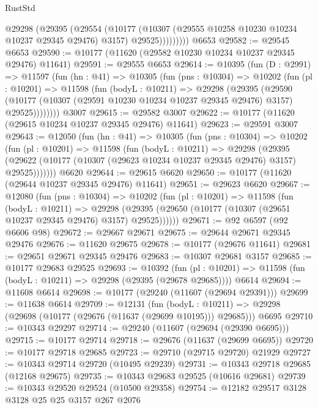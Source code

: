 \begin{lexlean}{RustStd}
\begin{coremodule}
              @29298
                (@29395
                  (@29554
                    (@10177
                      (@10307 (@29555 @10258 @10230 @10234 @10237 @29345 @29476) @3157)
                      @29525)))))))))
    @6653
@29582 := @29545 @6653
@29590 := @10177 (@11620 (@29582 @10230 @10234 @10237 @29345 @29476) @11641)
@29591 := @29555 @6653
@29614 := @10395
    (fun (D : @2991) =>
    @11597
      (fun (hn : @41) =>
      @10305
        (fun (pns : @10304) =>
        @10202
          (fun (pl : @10201) =>
          @11598
            (fun (bodyL : @10211) =>
            @29298
              (@29395
                (@29590
                  (@10177 (@10307 (@29591 @10230 @10234 @10237 @29345 @29476) @3157) @29525))))))))
    @3007
@29615 := @29582 @3007
@29622 := @10177 (@11620 (@29615 @10234 @10237 @29345 @29476) @11641)
@29623 := @29591 @3007
@29643 := @12050
    (fun (hn : @41) =>
    @10305
      (fun (pns : @10304) =>
      @10202
        (fun (pl : @10201) =>
        @11598
          (fun (bodyL : @10211) =>
          @29298
            (@29395
              (@29622 (@10177 (@10307 (@29623 @10234 @10237 @29345 @29476) @3157) @29525)))))))
    @6620
@29644 := @29615 @6620
@29650 := @10177 (@11620 (@29644 @10237 @29345 @29476) @11641)
@29651 := @29623 @6620
@29667 := @12080
    (fun (pns : @10304) =>
    @10202
      (fun (pl : @10201) =>
      @11598
        (fun (bodyL : @10211) =>
        @29298 (@29395 (@29650 (@10177 (@10307 (@29651 @10237 @29345 @29476) @3157) @29525))))))
@29671 := @92 @6597 (@92 @6606 @98)
@29672 := @29667 @29671
@29675 := @29644 @29671 @29345 @29476
@29676 := @11620 @29675
@29678 := @10177 (@29676 @11641)
@29681 := @29651 @29671 @29345 @29476
@29683 := @10307 @29681 @3157
@29685 := @10177 @29683 @29525
@29693 := @10392
    (fun (pl : @10201) => @11598 (fun (bodyL : @10211) => @29298 (@29395 (@29678 @29685))))
    @6614
@29694 := @11608 @6614
@29698 := @10177 (@29240 (@11607 (@29694 @29391)))
@29699 := @11638 @6614
@29709 := @12131
    (fun (bodyL : @10211) => @29298 (@29698 (@10177 (@29676 (@11637 (@29699 @10195))) @29685)))
    @6695
@29710 := @10343 @29297
@29714 := @29240 (@11607 (@29694 (@29390 @6695)))
@29715 := @10177 @29714
@29718 := @29676 (@11637 (@29699 @6695))
@29720 := @10177 @29718 @29685
@29723 := @29710 (@29715 @29720) @21929
@29727 := @10343 @29714 @29720 (@10495 @29239)
@29731 := @10343 @29718 @29685 (@12168 @29675)
@29735 := @10343 @29683 @29525 (@10616 @29681)
@29739 := @10343 @29520 @29524 (@10500 @29358)
@29754 := @12182
    @29517
    @3128
    @3128
    @25
    @25
    @3157
    @267
    @2076

\end{coremodule}
\end{lexlean}
